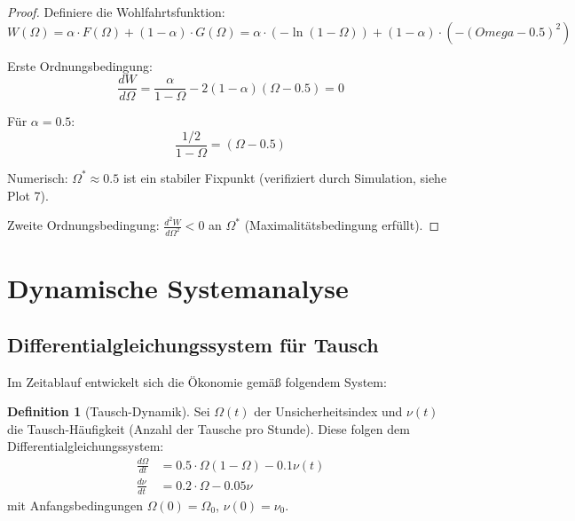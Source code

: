 \documentclass[a4paper,12pt]{article}
\theoremstyle{definition}
\newtheorem{definition}{Definition}
\begin{document}
\begin{proof}
    Definiere die Wohlfahrtsfunktion:
    \begin{equation}
        W(\Omega) = \alpha \cdot F(\Omega) + (1-\alpha) \cdot G(\Omega)
        = \alpha \cdot (-\ln(1-\Omega)) + (1-\alpha) \cdot (-(Omega-0.5)^2)
    \end{equation}
    
    Erste Ordnungsbedingung:
    \begin{equation}
        \frac{dW}{d\Omega} = \frac{\alpha}{1-\Omega} - 2(1-\alpha)(\Omega-0.5) = 0
    \end{equation}
    
    Für $\alpha = 0.5$:
    \begin{equation}
        \frac{1/2}{1-\Omega} = (\Omega-0.5)
    \end{equation}
    
    Numerisch: $\Omega^* \approx 0.5$ ist ein stabiler Fixpunkt (verifiziert durch Simulation, siehe Plot 7).
    
    Zweite Ordnungsbedingung: $\frac{d^2W}{d\Omega^2} < 0$ an $\Omega^*$ (Maximalitätsbedingung erfüllt).
\end{proof}

\section{Dynamische Systemanalyse}

\subsection{Differentialgleichungssystem für Tausch}

Im Zeitablauf entwickelt sich die Ökonomie gemäß folgendem System:

\begin{definition}[Tausch-Dynamik]
    Sei $\Omega(t)$ der Unsicherheitsindex und $\nu(t)$ die Tausch-Häufigkeit (Anzahl der Tausche pro Stunde). Diese folgen dem Differentialgleichungssystem:
    \begin{align}
        \frac{d\Omega}{dt} &= 0.5 \cdot \Omega(1-\Omega) - 0.1 \nu(t) \\
        \frac{d\nu}{dt} &= 0.2 \cdot \Omega - 0.05 \nu
    \end{align}
    mit Anfangsbedingungen $\Omega(0) = \Omega_0$, $\nu(0) = \nu_0$.
\end{definition}
\end{document}
